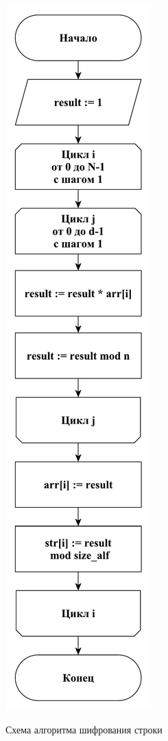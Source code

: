 \documentclass[a4paper,12pt]{article}
\begin{document}
\begin{figure}[h!]
    \begin{center}
    		{\includegraphics[scale = 0.5]{diagram/rsa2.pdf}}
       		\caption{Схема алгоритма шифрования строки }
       		\label{fig:s2}
	\end{center}
\end{figure}
\end{document}
